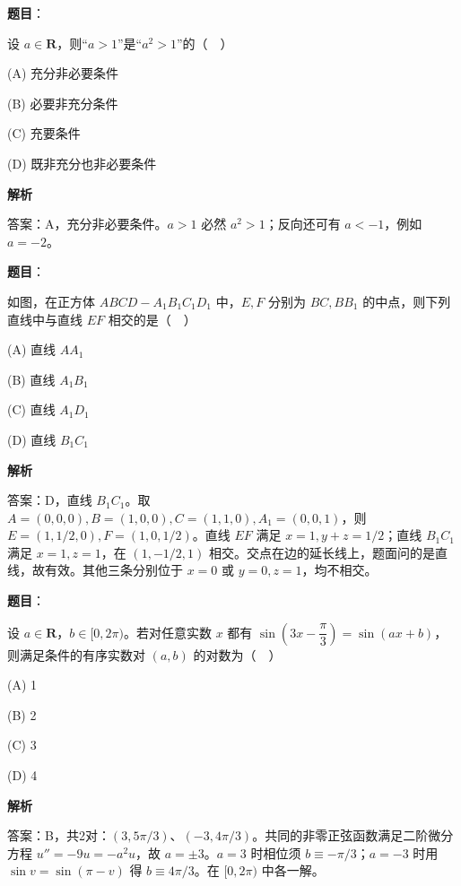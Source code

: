 \begin{answer}

\textbf{题目}：

设 \(a\in\mathbf R\)，则“\(a>1\)”是“\(a^2>1\)”的（　）

\noindent(A) 充分非必要条件

\noindent(B) 必要非充分条件

\noindent(C) 充要条件

\noindent(D) 既非充分也非必要条件

\textbf{解析}

答案：A，充分非必要条件。\(a>1\) 必然 \(a^2>1\)；反向还可有 \(a<-1\)，例如 \(a=-2\)。


\end{answer}
\begin{answer}

\textbf{题目}：

如图，在正方体 \(ABCD-A_1B_1C_1D_1\) 中，\(E,F\) 分别为 \(BC,BB_1\) 的中点，则下列直线中与直线 \(EF\) 相交的是（　）
\nopagebreak[4]
\begin{center}\end{center}
\nopagebreak[4]
\noindent(A) 直线 \(AA_1\)

\noindent(B) 直线 \(A_1B_1\)

\noindent(C) 直线 \(A_1D_1\)

\noindent(D) 直线 \(B_1C_1\)

\textbf{解析}

答案：D，直线 \(B_1C_1\)。取 \(A=(0,0,0), B=(1,0,0), C=(1,1,0), A_1=(0,0,1)\)，则 \(E=(1,1/2,0),F=(1,0,1/2)\)。直线 \(EF\) 满足 \(x=1,y+z=1/2\)；直线 \(B_1C_1\) 满足 \(x=1,z=1\)，在 \((1,-1/2,1)\) 相交。交点在边的延长线上，题面问的是直线，故有效。其他三条分别位于 \(x=0\) 或 \(y=0,z=1\)，均不相交。


\end{answer}
\begin{answer}

\textbf{题目}：

设 \(a\in\mathbf R\)，\(b\in[0,2\pi)\)。若对任意实数 \(x\) 都有 \(\sin\left(3x-\dfrac\pi3\right)=\sin(ax+b)\)，则满足条件的有序实数对 \((a,b)\) 的对数为（　）

\noindent(A) 1

\noindent(B) 2

\noindent(C) 3

\noindent(D) 4

\textbf{解析}

答案：B，共2对：\((3,5\pi/3)\)、\((-3,4\pi/3)\)。共同的非零正弦函数满足二阶微分方程 \(u''=-9u=-a^2u\)，故 \(a=\pm3\)。\(a=3\) 时相位须 \(b\equiv-\pi/3\)；\(a=-3\) 时用 \(\sin v=\sin(\pi-v)\) 得 \(b\equiv4\pi/3\)。在 \([0,2\pi)\) 中各一解。


\end{answer}
